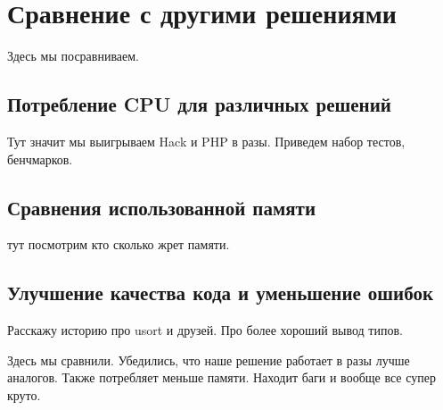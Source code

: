 
\chapter{Сравнение с другими решениями}
Здесь мы посравниваем.

\section{Потребление CPU для различных решений}
Тут значит мы выигрываем Hack и PHP в разы.
Приведем набор тестов, бенчмарков.

\section{Сравнения использованной памяти}
тут посмотрим кто сколько жрет памяти.

\section{Улучшение качества кода и уменьшение ошибок}
Расскажу историю про usort и друзей.
Про более хороший вывод типов.

\chapterconclusion
Здесь мы сравнили.
Убедились, что наше решение работает в разы лучше аналогов.
Также потребляет меньше памяти.
Находит баги и вообще все супер круто.